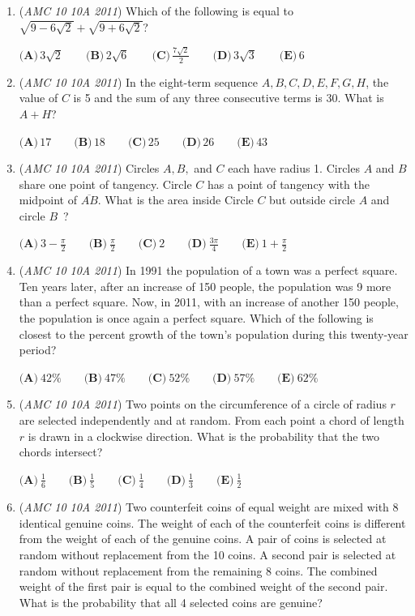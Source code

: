 \begin{enumerate}
	\item (\textit{AMC 10 10A 2011}) Which of the following is equal to $\sqrt{9-6\sqrt{2}}+\sqrt{9+6\sqrt{2}}$?


 $\textbf{(A)}\,3\sqrt2 \qquad\textbf{(B)}\,2\sqrt6 \qquad\textbf{(C)}\,\frac{7\sqrt2}{2} \qquad\textbf{(D)}\,3\sqrt3 \qquad\textbf{(E)}\,6$


	\item (\textit{AMC 10 10A 2011}) In the eight-term sequence $A,B,C,D,E,F,G,H$, the value of $C$ is 5 and the sum of any three consecutive terms is 30.  What is $A+H$?


 $\textbf{(A)}\,17 \qquad\textbf{(B)}\,18 \qquad\textbf{(C)}\,25 \qquad\textbf{(D)}\,26 \qquad\textbf{(E)}\,43$


	\item (\textit{AMC 10 10A 2011}) Circles $A, B,$ and $C$ each have radius 1. Circles $A$ and $B$ share one point of tangency. Circle $C$ has a point of tangency with the midpoint of $\overline{AB}$. What is the area inside Circle $C$ but outside circle $A$ and circle $B$ ?


 $\textbf{(A)}\ 3 - \frac{\pi}{2} \qquad \textbf{(B)}\ \frac{\pi}{2} \qquad \textbf{(C)}\  2 \qquad \textbf{(D)}\ \frac{3\pi}{4} \qquad \textbf{(E)}\ 1+\frac{\pi}{2}$


	\item (\textit{AMC 10 10A 2011}) In 1991 the population of a town was a perfect square. Ten years later, after an increase of 150 people, the population was 9 more than a perfect square. Now, in 2011, with an increase of another 150 people, the population is once again a perfect square. Which of the following is closest to the percent growth of the town's population during this twenty-year period?


 $\textbf{(A)}\ 42\% \qquad\textbf{(B)}\ 47\% \qquad\textbf{(C)}\ 52\%\qquad\textbf{(D)}\ 57\%\qquad\textbf{(E)}\ 62\%$


	\item (\textit{AMC 10 10A 2011}) Two points on the circumference of a circle of radius $r$ are selected independently and at random. From each point a chord of length $r$ is drawn in a clockwise direction. What is the probability that the two chords intersect?


 $\textbf{(A)}\ \frac{1}{6}\qquad\textbf{(B)}\ \frac{1}{5}\qquad\textbf{(C)}\ \frac{1}{4}\qquad\textbf{(D)}\ \frac{1}{3}\qquad\textbf{(E)}\ \frac{1}{2}$


	\item (\textit{AMC 10 10A 2011}) Two counterfeit coins of equal weight are mixed with 8 identical genuine coins. The weight of each of the counterfeit coins is different from the weight of each of the genuine coins. A pair of coins is selected at random without replacement from the 10 coins. A second pair is selected at random without replacement from the remaining 8 coins. The combined weight of the first pair is equal to the combined weight of the second pair. What is the probability that all 4 selected coins are genuine?



\end{enumerate}
